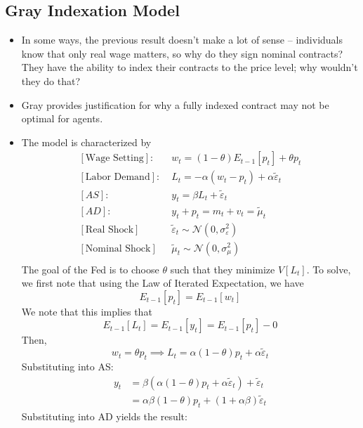 \documentclass[12pt]{article}
\begin{document}
\subsection{Gray Indexation Model}

\begin{itemize}
    \item In some ways, the previous result doesn't make a lot of sense -- individuals know that only real wage matters, so why do they sign nominal contracts? They have the ability to index their contracts to the price level; why wouldn't they do that?
    \item Gray provides justification for why a fully indexed contract may not be optimal for agents.
    \item The model is characterized by
    \[\begin{split}
        [\text{Wage Setting}]:&\; w_t = (1-\theta)E_{t-1}[p_t] + \theta p_t \\
        [\text{Labor Demand}]:&\; L_t = -\alpha (w_t-p_t) + \alpha \widetilde{\varepsilon}_t \\
        [AS]:&\; y_t = \beta L_t + \widetilde{\varepsilon}_t \\
        [AD]:&\; y_t + p_t = m_t + v_t = \widetilde{\mu}_t \\
        [\text{Real Shock}]&\; \widetilde{\varepsilon}_t \sim \mathcal{N}\left(0, \sigma_{\varepsilon}^2\right) \\
        [\text{Nominal Shock}]&\; \widetilde{\mu}_t \sim \mathcal{N}\left(0, \sigma_{\mu}^2\right) \\
    \end{split}\]
    The goal of the Fed is to choose $\theta$ such that they minimize $V[L_t]$. To solve, we first note that using the Law of Iterated Expectation, we have
    \[E_{t-1}[p_t] = E_{t-1}[w_t]\]
    We note that this implies that
    \[E_{t-1}[L_t] = E_{t-1}[y_t] = E_{t-1}[p_t] - 0\]
    Then, 
    \[w_t = \theta p_t \implies L_t = \alpha(1-\theta)p_t + \alpha \widetilde{\varepsilon}_t\]
    Substituting into AS:
    \[\begin{split}
        y_t &= \beta(\alpha(1-\theta)p_t + \alpha \widetilde{\varepsilon}_t) + \widetilde{\varepsilon}_t \\
        &= \alpha\beta(1-\theta)p_t + (1+\alpha\beta)\widetilde{\varepsilon}_t
    \end{split}\]
    Substituting into AD yields the result:
    \begin{equation}
        \begin{split}

\end{split}
\end{equation}
\end{itemize}
\end{document}
